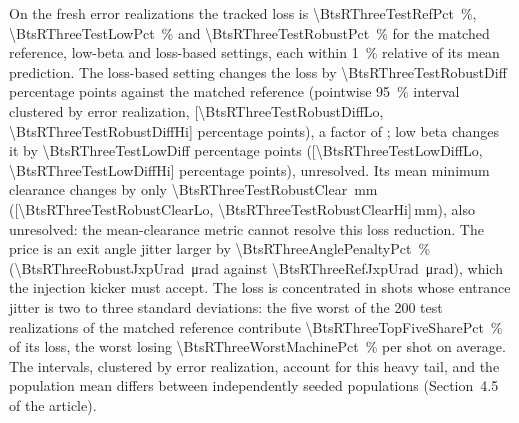 \documentclass[10pt,a4paper]{article}
\begin{document}
\begin{table}[htbp]\centering
\caption{Earlier steering of the matched reference (Matched) and optimized low beta on 200 error realizations (3 shots, 2\,000 particles each). $\bar c_{\min}$
is the mean minimum five-sigma clearance, Lost the tracked particle-loss fraction,
Predicted the mean Gaussian loss probability of the most loss-prone aperture,
Blocks the number of error realizations with any observed loss, and $x_{\rm rms}$,
$x'_{\rm rms}$ the rms exit centroid over shots. Reading errors are drawn separately for each setting; magnet errors, shots and particles are shared.}\label{tab:steering}
{\small}\end{table}

\begin{table}[htbp]\centering
\caption{Earlier fresh test of the matched reference (Matched), optimized low-beta and loss-based settings, with reading errors drawn per setting (200 steered error realizations, 3 shots,
2\,000 particles each). $\mu_x$: horizontal phase advance; $\hat\beta$: larger peak
beta; $\sigma_{x,j}$, $\sigma_{x',j}$: exit jitter from Eq.~(6) of the article;
$\bar P$: shot-averaged loss on the error-free line; Lost and Pred.: tracked and
predicted loss on the test realizations; Blocks: error realizations with any loss.}\label{tab:design}
{\small}\end{table}

On the fresh error realizations the tracked loss is \SI{\BtsRThreeTestRefPct}{\percent}, \SI{\BtsRThreeTestLowPct}{\percent}
and \SI{\BtsRThreeTestRobustPct}{\percent} for the matched reference, low-beta and loss-based settings,
each within \SI{1}{\percent} relative of its mean prediction. The loss-based setting changes the loss by
\num{\BtsRThreeTestRobustDiff} percentage points against the matched reference
(pointwise \SI{95}{\percent} interval clustered by error realization,
[\num{\BtsRThreeTestRobustDiffLo}, \num{\BtsRThreeTestRobustDiffHi}] percentage points), a factor
of \BtsRThreeLossRatio; low beta changes it by \num{\BtsRThreeTestLowDiff} percentage
points ([\num{\BtsRThreeTestLowDiffLo}, \num{\BtsRThreeTestLowDiffHi}] percentage points),
unresolved. Its mean minimum clearance changes by only
\SI{\BtsRThreeTestRobustClear}{\milli\metre}
([\num{\BtsRThreeTestRobustClearLo}, \num{\BtsRThreeTestRobustClearHi}]\,\si{\milli\metre}), also
unresolved: the
mean-clearance metric cannot resolve this loss reduction. The price is
an exit angle jitter larger by \SI{\BtsRThreeAnglePenaltyPct}{\percent}
(\SI{\BtsRThreeRobustJxpUrad}{\micro\radian} against \SI{\BtsRThreeRefJxpUrad}{\micro\radian}), which the
injection kicker must accept. The loss is concentrated in shots whose entrance jitter
is two to three standard deviations: the five worst of the 200 test realizations of the matched reference
contribute \SI{\BtsRThreeTopFiveSharePct}{\percent} of its loss, the worst losing
\SI{\BtsRThreeWorstMachinePct}{\percent} per shot on average. The intervals, clustered by error
realization, account for this heavy tail, and the population mean differs between independently
seeded populations (Section~4.5 of the article).
\end{document}
